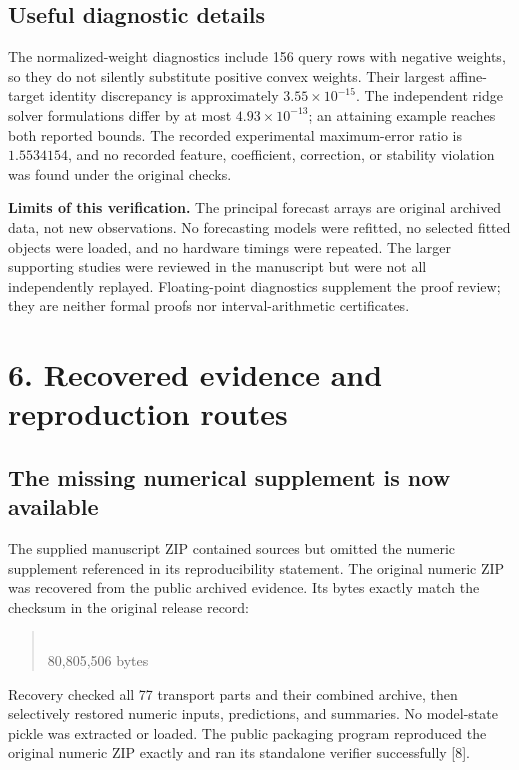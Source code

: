 \documentclass[11pt]{article}
\begin{document}
\subsection*{Useful diagnostic details}
The normalized-weight diagnostics include 156 query rows with negative
weights, so they do not silently substitute positive convex weights.
Their largest affine-target identity discrepancy is approximately
$3.55\times10^{-15}$. The independent ridge solver formulations differ
by at most $4.93\times10^{-13}$; an attaining example reaches both
reported bounds. The recorded experimental maximum-error ratio is
$1.5534154$, and no recorded feature, coefficient, correction, or
stability violation was found under the original checks.

\textbf{Limits of this verification.} The principal forecast arrays are
original archived data, not new observations. No forecasting models were
refitted, no selected fitted objects were loaded, and no hardware timings
were repeated. The larger supporting studies were reviewed in the
manuscript but were not all independently replayed. Floating-point
diagnostics supplement the proof review; they are neither formal proofs
nor interval-arithmetic certificates.

\newpage
\section*{6. Recovered evidence and reproduction routes}

\subsection*{The missing numerical supplement is now available}
The supplied manuscript ZIP contained sources but omitted the numeric
supplement referenced in its reproducibility statement. The original
numeric ZIP was recovered from the public archived evidence. Its bytes
exactly match the checksum in the original release record:
\begin{quote}
\\
80,805,506 bytes\\
\small{}
\end{quote}
Recovery checked all 77 transport parts and their combined archive,
then selectively restored numeric inputs, predictions, and summaries.
No model-state pickle was extracted or loaded. The public packaging
program reproduced the original numeric ZIP exactly and ran its
standalone verifier successfully [8].
\end{document}
